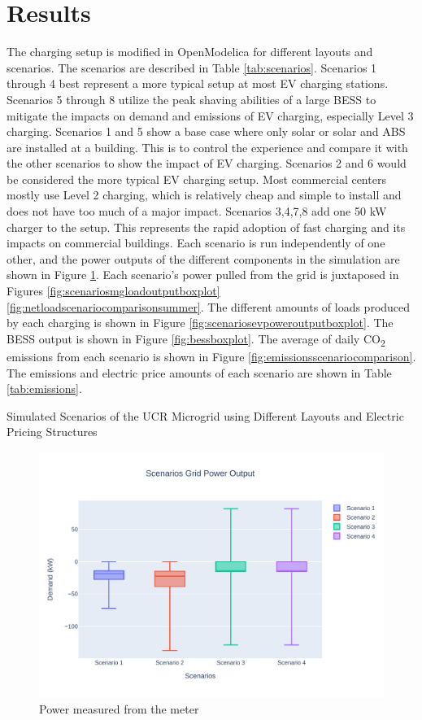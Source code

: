\documentclass[conference]{IEEEtran}
\begin{document}
\section{Results}
	The charging setup is modified in OpenModelica for different layouts and scenarios. The scenarios are described in Table \ref{tab:scenarios}. Scenarios 1 through 4 best represent a more typical setup at most EV charging stations. Scenarios 5 through 8 utilize the peak shaving abilities of a large BESS to mitigate the impacts on demand and emissions of EV charging, especially Level 3 charging. Scenarios 1 and 5 show a base case where only solar or solar and ABS are installed at a building. This is to control the experience and compare it with the other scenarios to show the impact of EV charging. Scenarios 2 and 6 would be considered the more typical EV charging setup. Most commercial centers mostly use Level 2 charging, which is relatively cheap and simple to install and does not have too much of a major impact. Scenarios 3,4,7,8 add one 50 kW charger to the setup. This represents the rapid adoption of fast charging and its impacts on commercial buildings.   Each scenario is run independently of one other, and the power outputs of the different components in the simulation are shown in Figure \ref{fig:scenariospoweroutputboxplot}. Each scenario’s power pulled from the grid is juxtaposed in Figures \ref{fig:scenariosmgloadoutputboxplot} \ref{fig:netloadscenariocomparisonsummer}.  The different amounts of loads produced by each charging is shown in Figure \ref{fig:scenariosevpoweroutputboxplot}. The BESS output is shown in Figure \ref{fig:bessboxplot}. The average of daily CO\textsubscript{2} emissions from each scenario is shown in Figure \ref{fig:emissionsscenariocomparison}. The emissions and electric price amounts of each scenario are shown in Table \ref{tab:emissions}.
	\begin{table}[H]
		\caption{Simulated Scenarios of the UCR Microgrid using Different Layouts and Electric Pricing Structures}
		\tiny
		
		\normalsize
		\label{tab:scenarios}
	\end{table}
	
	\begin{figure}[H]
		\centering
		\includegraphics[width=0.9\linewidth]{Fig/scenarios_power_output_boxplot}
		\caption{Power measured from the meter}
		\label{fig:scenariospoweroutputboxplot}
	\end{figure}
	
\end{document}
